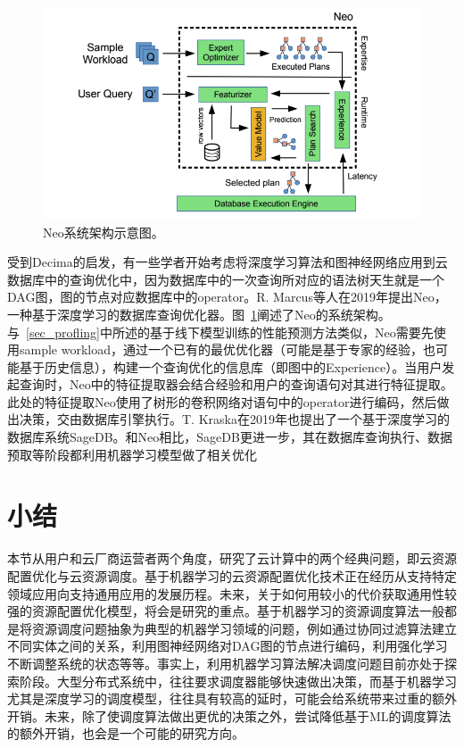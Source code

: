 \begin{figure}[h]
    \centerline{\includegraphics[width=\textwidth]{figures/neo-arch.png}}
    \caption{Neo系统架构示意图。}
    \label{neo_arch}
\end{figure}

受到Decima的启发，有一些学者开始考虑将深度学习算法和图神经网络应用到云数据库中的查询优化中，因为数据库中的一次查询所对应的语法树天生就是一个DAG图，图的节点对应数据库中的operator。R. Marcus等人在2019年提出Neo\parencite{marcus2019neo}，一种基于深度学习的数据库查询优化器。图~\ref{neo_arch}阐述了Neo的系统架构。与~\ref{sec_profling}中所述的基于线下模型训练的性能预测方法类似，Neo需要先使用sample workload，通过一个已有的最优优化器（可能是基于专家的经验，也可能基于历史信息），构建一个查询优化的信息库（即图中的Experience）。当用户发起查询时，Neo中的特征提取器会结合经验和用户的查询语句对其进行特征提取。此处的特征提取Neo使用了树形的卷积网络对语句中的operator进行编码，然后做出决策，交由数据库引擎执行。T. Kraska在2019年也提出了一个基于深度学习的数据库系统SageDB\parencite{47669}。和Neo相比，SageDB更进一步，其在数据库查询执行、数据预取等阶段都利用机器学习模型做了相关优化

\section{小结}

本节从用户和云厂商运营者两个角度，研究了云计算中的两个经典问题，即云资源配置优化与云资源调度。基于机器学习的云资源配置优化技术正在经历从支持特定领域应用向支持通用应用的发展历程。未来，关于如何用较小的代价获取通用性较强的资源配置优化模型，将会是研究的重点。基于机器学习的资源调度算法一般都是将资源调度问题抽象为典型的机器学习领域的问题，例如通过协同过滤算法建立不同实体之间的关系，利用图神经网络对DAG图的节点进行编码，利用强化学习不断调整系统的状态等等。事实上，利用机器学习算法解决调度问题目前亦处于探索阶段。大型分布式系统中，往往要求调度器能够快速做出决策，而基于机器学习尤其是深度学习的调度模型，往往具有较高的延时，可能会给系统带来过重的额外开销。未来，除了使调度算法做出更优的决策之外，尝试降低基于ML的调度算法的额外开销，也会是一个可能的研究方向。